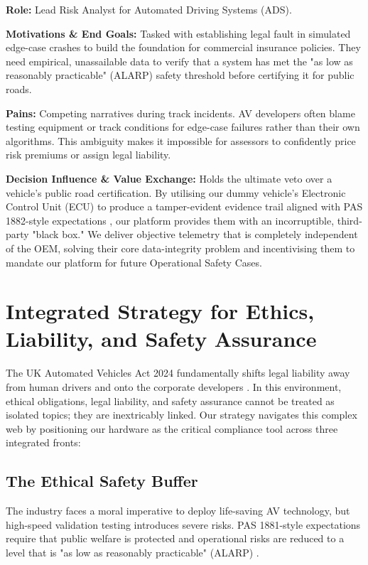 \documentclass[11pt, a4paper]{report}
\numberwithin{equation}{section}
\begin{document}
\begin{refsection}
\textbf{Role:} Lead Risk Analyst for Automated Driving Systems (ADS).

\textbf{Motivations \& End Goals:} Tasked with establishing legal fault in simulated edge-case crashes to build the foundation for commercial insurance policies. They need empirical, unassailable data to verify that a system has met the "as low as reasonably practicable" (ALARP) safety threshold before certifying it for public roads.

\textbf{Pains:} Competing narratives during track incidents. AV developers often blame testing equipment or track conditions for edge-case failures rather than their own algorithms. This ambiguity makes it impossible for assessors to confidently price risk premiums or assign legal liability.

\textbf{Decision Influence \& Value Exchange:} Holds the ultimate veto over a vehicle's public road certification. By utilising our dummy vehicle's Electronic Control Unit (ECU) to produce a tamper-evident evidence trail aligned with PAS 1882-style expectations \cite{pas1882}, our platform provides them with an incorruptible, third-party "black box." We deliver objective telemetry that is completely independent of the OEM, solving their core data-integrity problem and incentivising them to mandate our platform for future Operational Safety Cases.

\section{Integrated Strategy for Ethics, Liability, and Safety Assurance}
\label{sec:automated_vehicles_act_2024}
\label{sec:ch7-ethics-liability}

The UK Automated Vehicles Act 2024 fundamentally shifts legal liability away from human drivers and onto the corporate developers \cite{lawcom_avs_2024}. In this environment, ethical obligations, legal liability, and safety assurance cannot be treated as isolated topics; they are inextricably linked. Our strategy navigates this complex web by positioning our hardware as the critical compliance tool across three integrated fronts:

\subsection{The Ethical Safety Buffer}

The industry faces a moral imperative to deploy life-saving AV technology, but high-speed validation testing introduces severe risks. PAS 1881-style expectations require that public welfare is protected and operational risks are reduced to a level that is "as low as reasonably practicable" (ALARP) \cite{pas1881}.


\end{refsection}
\end{document}
